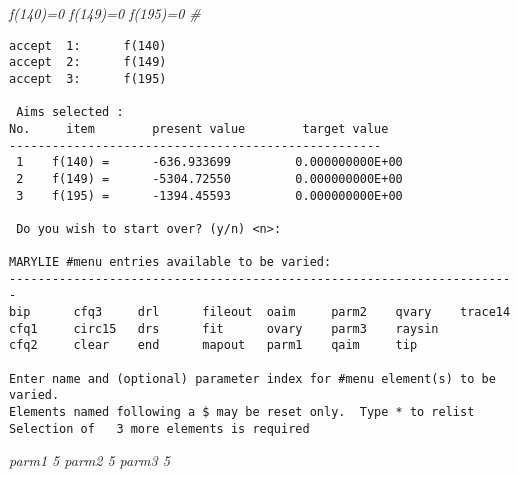 {\em f(140)=0 f(149)=0 f(195)=0 \#}
\begin{footnotesize}
\begin{verbatim}
accept  1:      f(140)
accept  2:      f(149)
accept  3:      f(195)

 Aims selected :
No.     item        present value        target value
----------------------------------------------------
 1    f(140) =      -636.933699         0.000000000E+00
 2    f(149) =      -5304.72550         0.000000000E+00
 3    f(195) =      -1394.45593         0.000000000E+00

 Do you wish to start over? (y/n) <n>:

MARYLIE #menu entries available to be varied:
-----------------------------------------------------------------------
bip      cfq3     drl      fileout  oaim     parm2    qvary    trace14
cfq1     circ15   drs      fit      ovary    parm3    raysin
cfq2     clear    end      mapout   parm1    qaim     tip

Enter name and (optional) parameter index for #menu element(s) to be varied.
Elements named following a $ may be reset only.  Type * to relist
Selection of   3 more elements is required
\end{verbatim}
\end{footnotesize}
{\em parm1 5 parm2 5 parm3 5}

